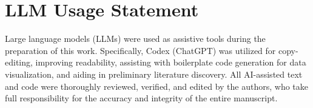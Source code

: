\clearpage
\section*{LLM Usage Statement}
Large language models (LLMs) were used as assistive tools during the preparation of this work. Specifically, Codex (ChatGPT) was utilized for copy-editing, improving readability, assisting with boilerplate code generation for data visualization, and aiding in preliminary literature discovery. All AI-assisted text and code were thoroughly reviewed, verified, and edited by the authors, who take full responsibility for the accuracy and integrity of the entire manuscript.
